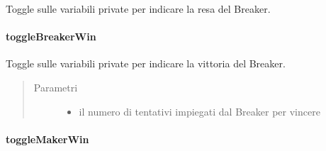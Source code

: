 \documentclass[letterpaper,10pt,italian,openany,oneside]{sphinxmanual}
\begin{document}
\begin{fulllineitems}
\label{\detokenize{test/it/unicam/cs/pa/mastermind/gamecore/MatchState:it.unicam.cs.pa.mastermind.gamecore.MatchState.toggleBreakerGiveUp()}}
Toggle sulle variabili private per indicare la resa del Breaker.

\end{fulllineitems}



\paragraph{toggleBreakerWin}
\label{\detokenize{test/it/unicam/cs/pa/mastermind/gamecore/MatchState:togglebreakerwin}}

\begin{fulllineitems}
\label{\detokenize{test/it/unicam/cs/pa/mastermind/gamecore/MatchState:it.unicam.cs.pa.mastermind.gamecore.MatchState.toggleBreakerWin(int)}}
Toggle sulle variabili private per indicare la vittoria del Breaker.
\begin{quote}\begin{description}
\item[{Parametri}] \leavevmode\begin{itemize}
\item {} 
 \textendash{} il numero di tentativi impiegati dal Breaker per vincere

\end{itemize}

\end{description}\end{quote}

\end{fulllineitems}



\paragraph{toggleMakerWin}
\label{\detokenize{test/it/unicam/cs/pa/mastermind/gamecore/MatchState:togglemakerwin}}
\end{document}
